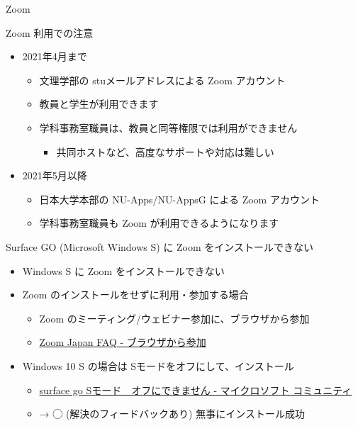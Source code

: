 \documentclass[a4j,10pt]{jsarticle}
\def\lthtmlcheckvsize{\ifdim\ht\sizebox<\vsize 
  \ifdim\wd\sizebox<\hsize\expandafter\hfill\fi \expandafter\vfill
  \else\expandafter\vss\fi}%
\begin{document}
{\newpage\clearpage
{}%
\begin{frame}[label={sec:orgf463a24},fragile]{Zoom}
\begin{block}{Zoom 利用での注意}
\begin{itemize}
\item 2021年4月まで
\begin{itemize}
\item 文理学部の stuメールアドレスによる Zoom アカウント
\item 教員と学生が利用できます
\item 学科事務室職員は、教員と同等権限では利用ができません
\begin{itemize}
\item 共同ホストなど、高度なサポートや対応は難しい
\end{itemize}
\end{itemize}
\par
\item 2021年5月以降
\begin{itemize}
\item 日本大学本部の NU-Apps/NU-AppsG による Zoom アカウント
\item 学科事務室職員も Zoom が利用できるようになります
\end{itemize}
\end{itemize}
\end{block}
\par
\begin{block}{Surface GO (Microsoft Windows S) に Zoom をインストールできない}
\begin{itemize}
\item Windows S に Zoom をインストールできない
\par
\item Zoom のインストールをせずに利用・参加する場合
\begin{itemize}
\item Zoom のミーティング/ウェビナー参加に、ブラウザから参加
\item \href{https://sites.google.com/zoom.us/zoomjapanfaq/faq/join-from-browser}{Zoom Japan FAQ - ブラウザから参加}
\end{itemize}
\par
\item Windows 10 S の場合は Sモードをオフにして、インストール
\begin{itemize}
\item \href{https://answers.microsoft.com/ja-jp/surface/forum/all/surface-go-s\%E3\%83\%A2\%E3\%83\%BC\%E3\%83\%89/e3a51b44-fcb4-463b-aaa6-a6b23c7e43b7}{surface go Sモード　オフにできません - マイクロソフト コミュニティ}
\item → ◯ (解決のフィードバックあり) 無事にインストール成功
\end{itemize}
\end{itemize}
\end{block}
\end{frame}%
\lthtmlfigureZ
\lthtmlcheckvsize\clearpage}
\end{document}
